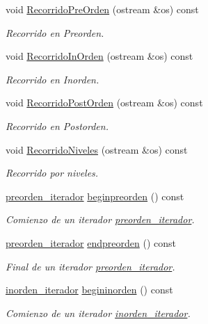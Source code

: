 \begin{DoxyCompactItemize}
void \hyperlink{classArbolBinario_af8cd1ed84675bcb2075ba1a502d8ee39}{Recorrido\+Pre\+Orden} (ostream \&os) const
\begin{DoxyCompactList}\small\item\em Recorrido en Preorden. \end{DoxyCompactList}\item 
void \hyperlink{classArbolBinario_a717119bc343e038c8af7c00423c9b103}{Recorrido\+In\+Orden} (ostream \&os) const
\begin{DoxyCompactList}\small\item\em Recorrido en Inorden. \end{DoxyCompactList}\item 
void \hyperlink{classArbolBinario_aa8380fa17126e49693942ddeadf3adc5}{Recorrido\+Post\+Orden} (ostream \&os) const
\begin{DoxyCompactList}\small\item\em Recorrido en Postorden. \end{DoxyCompactList}\item 
void \hyperlink{classArbolBinario_af1617842b59246c0bbb6e2a81b7638b6}{Recorrido\+Niveles} (ostream \&os) const
\begin{DoxyCompactList}\small\item\em Recorrido por niveles. \end{DoxyCompactList}\item 
\hyperlink{classArbolBinario_1_1preorden__iterador}{preorden\+\_\+iterador} \hyperlink{classArbolBinario_aa0fc3ba9f91f7167d1f83df2f3b1a8b9}{beginpreorden} () const
\begin{DoxyCompactList}\small\item\em Comienzo de un iterador \hyperlink{classArbolBinario_1_1preorden__iterador}{preorden\+\_\+iterador}. \end{DoxyCompactList}\item 
\hyperlink{classArbolBinario_1_1preorden__iterador}{preorden\+\_\+iterador} \hyperlink{classArbolBinario_ad1c64408fd252fa134125d7ca5717e3a}{endpreorden} () const
\begin{DoxyCompactList}\small\item\em Final de un iterador \hyperlink{classArbolBinario_1_1preorden__iterador}{preorden\+\_\+iterador}. \end{DoxyCompactList}\item 
\hyperlink{classArbolBinario_1_1inorden__iterador}{inorden\+\_\+iterador} \hyperlink{classArbolBinario_af55ee35607b74ebc3036dc9c5c1c2ce7}{begininorden} () const
\begin{DoxyCompactList}\small\item\em Comienzo de un iterador \hyperlink{classArbolBinario_1_1inorden__iterador}{inorden\+\_\+iterador}. \end{DoxyCompactList}\item 

\end{DoxyCompactItemize}
